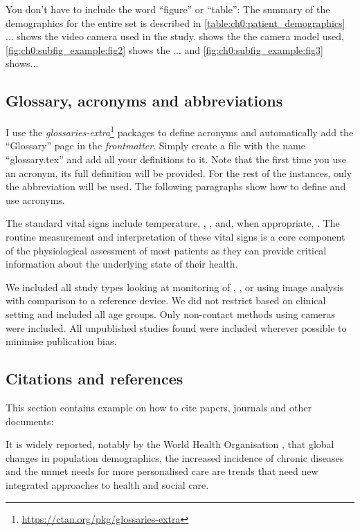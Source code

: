 You don't have to include the word ``figure'' or ``table'': The summary of the demographics for the entire set is described in \cref{table:ch0:patient_demographics} ...  shows the video camera used in the study.  shows the the camera model used, \cref{fig:ch0:subfig_example:fig2} shows the ... and \cref{fig:ch0:subfig_example:fig3} shows...


\subsection{Glossary, acronyms and abbreviations}


I use the \textit{glossaries-extra}\footnote{\url{https://ctan.org/pkg/glossaries-extra}} packages to define acronyms and automatically add the ``Glossary'' page in the \textit{frontmatter}. Simply create a file with the name ``glossary.tex'' and add all your definitions to it. Note that the first time you use an acronym, its full definition will be provided. For the rest of the instances, only the abbreviation will be used. The following paragraphs show how to define and use acronyms.

The standard vital signs include temperature, , ,  and, when appropriate, . The routine measurement and interpretation of these vital signs is a core component of the physiological assessment of most patients \cite{prior1977physical,goldberg2005practical} as they can provide critical information about the underlying state of their health. 

We included all study types looking at monitoring of , ,  or  using image analysis with comparison to a reference device. We did not restrict based on clinical setting and included all age groups. Only non-contact methods using cameras were included. All unpublished studies found were included wherever possible to minimise publication bias.


\subsection{Citations and references}


This section contains example on how to cite papers, journals and other documents:

It is widely reported, notably by the World Health Organisation \cite{stroetmann2010can}, that global changes in population demographics, the increased incidence of chronic diseases and the unmet needs for more personalised care are trends that need new integrated approaches to health and social care. \cite{brooks1984infrared}


